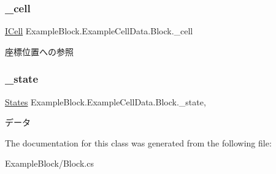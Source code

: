 \subsubsection{\texorpdfstring{\+\_\+cell}{\_cell}}
{\footnotesize\ttfamily \mbox{\hyperlink{interface_hexagonal_map_1_1_domain_1_1_hex_map_1_1_i_cell}{I\+Cell}} Example\+Block.\+Example\+Cell\+Data.\+Block.\+\_\+cell\hspace{0.3cm}{\ttfamily [get]}}



座標位置への参照 

\mbox{\label{class_example_block_1_1_example_cell_data_1_1_block_a6818333cb2347c286e82ecfa3ea1e8b2}} 
\subsubsection{\texorpdfstring{\+\_\+state}{\_state}}
{\footnotesize\ttfamily \mbox{\hyperlink{namespace_example_block_1_1_example_cell_data_a6921c403602d917464ccf88b5ac8b2bc}{States}} Example\+Block.\+Example\+Cell\+Data.\+Block.\+\_\+state\hspace{0.3cm}{\ttfamily [get]}, {\ttfamily [set]}}



データ 



The documentation for this class was generated from the following file\+:\begin{DoxyCompactItemize}
\item 
Example\+Block/Block.\+cs\end{DoxyCompactItemize}
